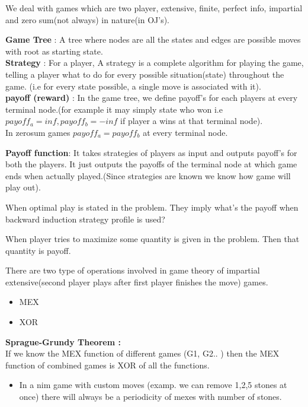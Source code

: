 \documentclass[../Notes.tex]{subfiles}
\begin{document}
We deal with games which are two player, extensive, finite, perfect info, impartial and zero sum(not always) in nature(in OJ's).
 
\textbf{Game Tree} : A tree where nodes are all the states and edges are possible moves with root as starting state.\\
\textbf{Strategy} : For a player, A strategy is a complete algorithm for playing the game, telling a player what to do for every possible situation(state) throughout the game. (i.e for every state possible, a single move is associated with it).\\
\textbf{payoff (reward)} : In the game tree, we define payoff's for each players at every terminal node.(for example it may simply state who won i.e $payoff_{a}=inf, payoff_{b}=-inf$ if player a wins at that terminal node).\\
In zerosum games $payoff_{a} = payoff_{b}$ at every terminal node.

\textbf{Payoff function}: It takes strategies of players as input and outputs payoff's for both the players. It just outputs the payoffs of the terminal node at which game ends when actually played.(Since strategies are known we know how game will play out).

When optimal play is stated in the problem. They imply what's the payoff when backward induction strategy profile is used?

When player tries to maximize some quantity is given in the problem. Then that quantity is payoff.
\pagebreak

There are two type of operations involved in game theory of impartial extensive(second player plays after first player finishes the move) games.
\begin{itemize}
	\item MEX
	\item XOR
\end{itemize}

\textbf{Sprague-Grundy Theorem :} \\

If we know the MEX function of different games (G1, G2.. ) then the MEX function of combined games is XOR of all the functions.

\begin{itemize}
	\item In a nim game with custom moves (examp. we can remove 1,2,5 stones at once) there will always be a periodicity of mexes with number of stones.
\end{itemize}
\end{document}
